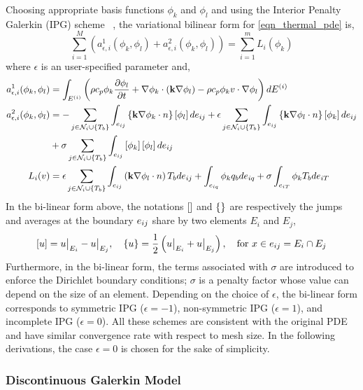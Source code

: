 Choosing appropriate basis functions $\phi_k$ and $\phi_l$ and using the Interior Penalty Galerkin (IPG) scheme ~\cite{Cohen and pernet 2018}, the variational bilinear form for \cref{eqn_thermal_pde} is,
\begin{equation}
    \sum_{i=1}^{M}\left(a^{1}_{\epsilon,i}(\phi_k,\phi_l) + a^{2}_{\epsilon,i}(\phi_k,\phi_l)\right) = \sum_{i=1}^{m}L_i(\phi_k)
\end{equation}
where $\epsilon$ is an user-specified parameter and,
\begin{subequations}
    \begin{align}
        a^{1}_{\epsilon,i}(\phi_k,\phi_l) &= \int_{E^{(i)}}\left(\rho c_p \phi_k \frac{\partial \phi_l}{\partial t} + \nabla \phi_k\cdot\left(\mathbf{k}\nabla \phi_l\right) - \rho c_p \phi_k v\cdot\nabla\phi_l\right)dE^{(i)}\\
        a^{2}_{\epsilon,i}(\phi_k,\phi_l) &= -\sum_{j\in\mathcal{N}_i\cup\left\{T_b\right\}}\int_{e_{ij}}\left\{\mathbf{k}\nabla\phi_k\cdot n\right\}\left[\phi_l\right]de_{ij} + \epsilon\sum_{j\in\mathcal{N}_i\cup\left\{T_b\right\}}\int_{e_{ij}}\left\{\mathbf{k}\nabla\phi_l\cdot n\right\}\left[\phi_k\right]de_{ij} \notag\\
        &+ \sigma\sum_{j\in\mathcal{N}_i\cup\left\{T_b\right\}}\int_{e_{ij}}\left[\phi_k\right]\left[\phi_l\right]de_{ij}\\
        L_i(v) &= \epsilon\sum_{j\in\mathcal{N}_i\cup\left\{T_b\right\}}\int_{e_{ij}}\left(\mathbf{k}\nabla\phi_l\cdot n\right)T_b de_{ij} + \int_{e_{iq}}\phi_k q_b de_{iq} + \sigma\int_{e_{iT}}\phi_k T_b de_{iT}
    \end{align}
\end{subequations}
In the bi-linear form above, the notations $\left[\right]$ and $\left\{\right\}$ are respectively the jumps and averages at the boundary $e_{ij}$ share by two elements $E_i$ and $E_j$,
\[
    \left[u\right] = u\big|_{E_i} - u\big|_{E_j},\quad \left\{u\right\} = \frac{1}{2}\left(u\big|_{E_i} + u\big|_{E_j}\right), \quad \text{for } x\in e_{ij} = E_i\cap E_j
\]
Furthermore, in the bi-linear form, the terms associated with $\sigma$ are introduced to enforce the Dirichlet boundary conditions; $\sigma$ is a penalty factor whose value can depend on the size of an element. Depending on the choice of $\epsilon$, the bi-linear form corresponds to symmetric IPG ($\epsilon=-1$), non-symmetric IPG ($\epsilon=1$), and incomplete IPG ($\epsilon=0$). All these schemes are consistent with the original PDE and have similar convergence rate with respect to mesh size. In the following derivations, the case $\epsilon=0$ is chosen for the sake of simplicity.

\subsubsection{Discontinuous Galerkin Model}

